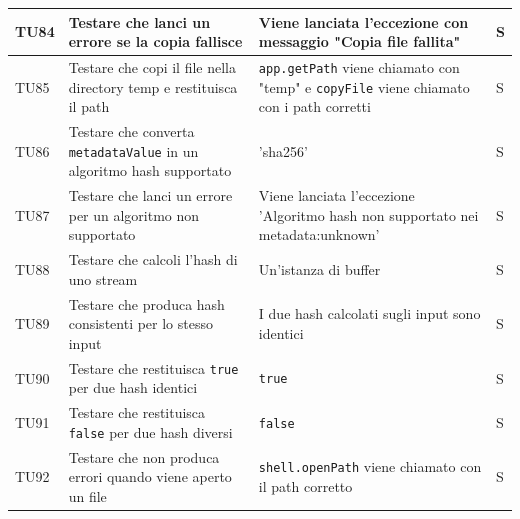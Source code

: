 \documentclass[a4paper,12pt]{article}
\begin{document}
\begin{longtable}{|M{1.2cm}|M{5cm}|M{8cm}|M{1.5cm}|}
            TU84 & Testare che \texttt{} lanci un errore se la copia fallisce & Viene lanciata l'eccezione con messaggio "Copia file fallita" & S \\
            \hline

            TU85 & Testare che \texttt{} copi il file nella directory temp e restituisca il path & \texttt{app.getPath} viene chiamato con "temp" e \texttt{copyFile} viene chiamato con i path corretti & S \\
            \hline

            TU86 & Testare che \texttt{} converta \texttt{metadataValue} in un algoritmo hash supportato & 'sha256' & S \\
            \hline

            TU87 & Testare che \texttt{} lanci un errore per un algoritmo non supportato & Viene lanciata l'eccezione 'Algoritmo hash non supportato nei metadata:unknown' & S \\
            \hline

            TU88 & Testare che \texttt{} calcoli l'hash di uno stream & Un'istanza di buffer & S \\
            \hline

            TU89 & Testare che \texttt{} produca hash consistenti per lo stesso input & I due hash calcolati sugli input sono identici & S \\
            \hline
            
            TU90 & Testare che \texttt{} restituisca \texttt{true} per due hash identici & \texttt{true} & S \\
            \hline
          
            TU91 & Testare che \texttt{} restituisca \texttt{false} per due hash diversi & \texttt{false} & S \\
            \hline

            TU92 & Testare che \texttt{} non produca errori quando viene aperto un file & \texttt{shell.openPath} viene chiamato con il path corretto & S \\
            \hline


\end{longtable}
\end{document}
